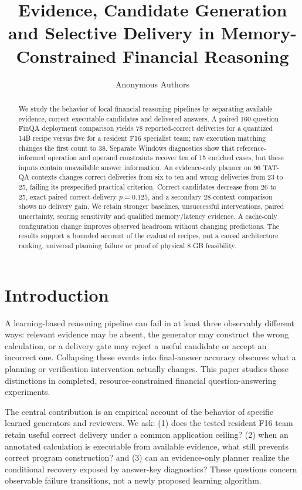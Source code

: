 \documentclass[10pt]{article}
\title{Evidence, Candidate Generation and Selective Delivery in Memory-Constrained Financial Reasoning}
\author{Anonymous Authors}
\begin{document}
\maketitle
{}
\begin{abstract}We study the behavior of local financial-reasoning pipelines by separating available evidence, correct executable candidates and delivered answers. A paired 160-question FinQA deployment comparison yields 78 reported-correct deliveries for a quantized 14B recipe versus five for a resident F16 specialist team; raw execution matching changes the first count to 38. Separate Windows diagnostics show that reference-informed operation and operand constraints recover ten of 15 enriched cases, but these inputs contain unavailable answer information. An evidence-only planner on 96 TAT-QA contexts changes correct deliveries from six to ten and wrong deliveries from 23 to 25, failing its prespecified practical criterion. Correct candidates decrease from 26 to 25, exact paired correct-delivery $p=0.125$, and a secondary 28-context comparison shows no delivery gain. We retain stronger baselines, unsuccessful interventions, paired uncertainty, scoring sensitivity and qualified memory/latency evidence. A cache-only configuration change improves observed headroom without changing predictions. The results support a bounded account of the evaluated recipes, not a causal architecture ranking, universal planning failure or proof of physical 8 GB feasibility.\end{abstract}
\section{Introduction}A learning-based reasoning pipeline can fail in at least three observably different ways: relevant evidence may be absent, the generator may construct the wrong calculation, or a delivery gate may reject a useful candidate or accept an incorrect one. Collapsing these events into final-answer accuracy obscures what a planning or verification intervention actually changes. This paper studies those distinctions in completed, resource-constrained financial question-answering experiments.

The central contribution is an empirical account of the behavior of specific learned generators and reviewers. We ask: (1) does the tested resident F16 team retain useful correct delivery under a common application ceiling? (2) when an annotated calculation is executable from available evidence, what still prevents correct program construction? and (3) can an evidence-only planner realize the conditional recovery exposed by answer-key diagnostics? These questions concern observable failure transitions, not a newly proposed learning algorithm.
\end{document}

